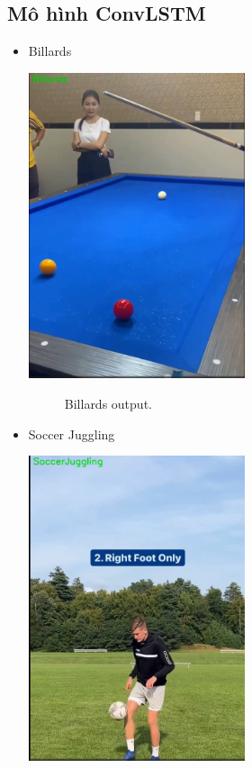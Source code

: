 \subsection{Mô hình ConvLSTM}
\begin{itemize}
    \item Billards
    
        \includegraphics[width=0.5\textwidth]{Figures/bia_conv.png}
        \begin{figure}[h!]
    	\centering
    	\caption[Billards output .]{Billards output.}
    	\label{bia_conv.png} 
        \end{figure}
    \item Soccer Juggling

        \includegraphics[width=0.5\textwidth]{Figures/soccer_conv.png}
        \begin{figure}[h!]
    	\centering
    	

\end{figure}
\end{itemize}
